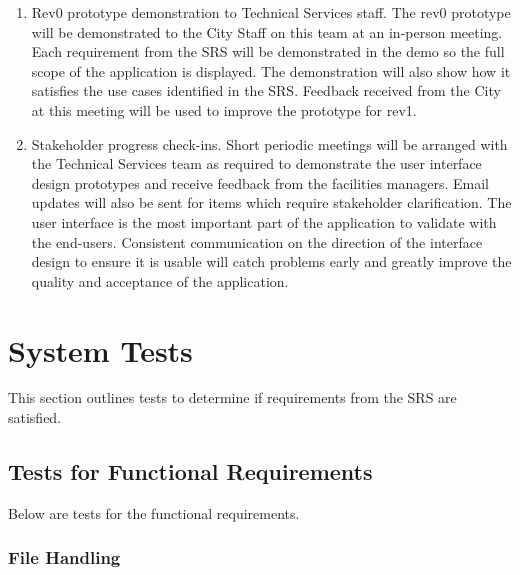 \documentclass[12pt, titlepage]{article}
\begin{document}
\begin{enumerate}
  \item Rev0 prototype demonstration to Technical Services staff. The rev0
    prototype will be demonstrated to the City Staff on this team at
    an in-person
    meeting. Each requirement from the SRS will be demonstrated in
    the demo so the
    full scope of the application is displayed. The demonstration will also show
    how it satisfies the use cases identified in the SRS. Feedback
    received from the
    City at this meeting will be used to improve the prototype for rev1.

  \item Stakeholder progress check-ins. Short periodic meetings will be arranged
    with the Technical Services team as required to demonstrate the
    user interface
    design prototypes and receive feedback from the facilities
    managers. Email updates
    will also be sent for items which require stakeholder
    clarification. The user interface is the most important part of
    the application to validate with the end-users.
    Consistent communication on the direction of the interface design
    to ensure it
    is usable will catch problems early and greatly improve the quality and
    acceptance of the application.
\end{enumerate}

\section{System Tests}

This section outlines tests to determine if requirements from the SRS
are satisfied.

\subsection{Tests for Functional Requirements}

Below are tests for the functional requirements.

\subsubsection{File Handling}
\end{document}
